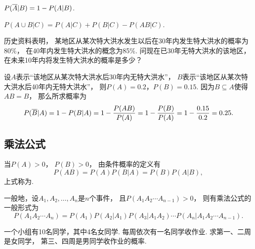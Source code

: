 \begin{property}
\(P(\SetComplementaryL{A} \vert B)
= 1 - P(A \vert B)\).
\end{property}

\begin{property}
\(P(A \cup B \vert C)
= P(A \vert C) + P(B \vert C) - P(AB \vert C)\).
\end{property}

\begin{example}
历史资料表明，
某地区从某次特大洪水发生以后在30年内发生特大洪水的概率为80\%，
在40年内发生特大洪水的概念为85\%.
问现在已30年无特大洪水的该地区，
在未来10年内将发生特大洪水的概率是多少？
\begin{solution}
设\(A\)表示“该地区从某次特大洪水后30年内无特大洪水”，
\(B\)表示“该地区从某次特大洪水后40年内无特大洪水”，
则\(P(A) = 0.2\)，\(P(B) = 0.15\).
因为\(B \subseteq A\)使得\(AB = B\)，
那么所求概率为\begin{equation*}
	P(\SetComplementaryL{B} \vert A)
	= 1 - P(B \vert A)
	= 1 - \frac{P(AB)}{P(A)}
	= 1 - \frac{P(B)}{P(A)}
	= 1 - \frac{0.15}{0.2}
	= 0.25.
\end{equation*}
\end{solution}
\end{example}

\subsection{乘法公式}
\begin{theorem}[概率的乘法]
当\(P(A) > 0\)，
\(P(B) > 0\)，
由条件概率的定义有\begin{equation}
	P(AB) = P(A) P(B \vert A) = P(B) P(A \vert B),
\end{equation}
上式称为.

一般地，设\(A_1,A_2,\dotsc,A_n\)是\(n\)个事件，
且\(P(A_1 A_2 \dotsm A_{n-1}) > 0\)，
则有乘法公式的一般形式为\begin{equation}
	P(A_1 A_2 \dotsm A_n)
	= P(A_1) P(A_2 \vert A_1) P(A_3 \vert A_1 A_2) \dotsm P(A_n \vert A_1 A_2 \dotsm A_{n-1}).
\end{equation}
\end{theorem}

\begin{example}
一个小组有10名同学，其中4名女同学.
每周依次有一名同学收作业.
求第一、二周是女同学，
第三、四周是男同学收作业的概率.
\end{example}

